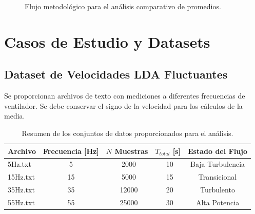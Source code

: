 \documentclass[11pt, a4paper]{article}
\begin{document}
\begin{figure}[htbp]
    \centering
    \caption{Flujo metodológico para el análisis comparativo de promedios.}
\end{figure}

\newpage
\section{Casos de Estudio y Datasets}

\subsection{Dataset de Velocidades LDA Fluctuantes}
Se proporcionan archivos de texto con mediciones a diferentes frecuencias de ventilador. Se debe conservar el signo de la velocidad para los cálculos de la media.

\begin{table}[htbp]
    \centering
    \begin{tabular}{lcccc}
        \toprule
        Archivo & Frecuencia [Hz] & $N$ Muestras & $T_{total}$ [s] & Estado del Flujo \\
        \midrule
        5Hz.txt & 5 & ~2000 & ~10 & Baja Turbulencia \\
        15Hz.txt & 15 & ~5000 & ~15 & Transicional \\
        35Hz.txt & 35 & ~12000 & ~20 & Turbulento \\
        55Hz.txt & 55 & ~25000 & ~30 & Alta Potencia \\
        \bottomrule
    \end{tabular}
    \caption{Resumen de los conjuntos de datos proporcionados para el análisis.}
\end{table}
\end{document}
